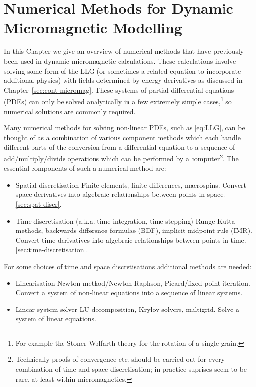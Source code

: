 \chapter{Numerical Methods for Dynamic Micromagnetic Modelling}
\label{sec:numer-meth-micr}

In this Chapter we give an overview of numerical methods that have previously been used in dynamic micromagnetic calculations.
These calculations involve solving some form of the LLG (or sometimes a related equation to incorporate additional physics) with fields determined by energy derivatives as discussed in Chapter~\ref{sec:cont-micromag}.
These systems of partial differential equations (PDEs) can only be solved analytically in a few extremely simple cases,\footnote{For example the Stoner-Wolfarth theory for the rotation of a single grain.\cite{Stoner1948a}}\cite{Aharoni1996} so numerical solutions are commonly required.

Many numerical methods for solving non-linear PDEs, such as \eqref{eq:LLG}, can be thought of as a combination of various component methods which each handle different parts of the conversion from a differential equation to a sequence of add/multiply/divide operations which can be performed by a computer\footnote{Technically proofs of convergence etc. should be carried out for every combination of time and space discretisation\cite[pg. 382]{Iserles2009}; in practice suprises seem to be rare, at least within micromagnetics.}.
The essential components of such a numerical method are:

\begin{itemize}
\item Spatial discretisation \eg Finite elements, finite differences, macrospins. Convert space derivatives into algebraic relationships between points in space. \autoref{sec:spat-discr}.

\item Time discretisation (a.k.a. time integration, time stepping) \eg Runge-Kutta methods, backwards difference formulae (BDF), implicit midpoint rule (IMR). Convert time derivatives into algebraic relationships between points in time. \autoref{sec:time-discretisation}.
\end{itemize}

For some choices of time and space discretisations additional methods are needed:
\begin{itemize}
\item Linearisation \eg Newton method/Newton-Raphson, Picard/fixed-point iteration. Convert a system of non-linear equations into a sequence of linear systems.
\item Linear system solver \eg LU decomposition, Krylov solvers, multigrid. Solve a system of linear equations.
\end{itemize}


